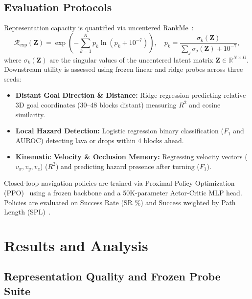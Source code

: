 \documentclass{svproc}
\begin{document}
\subsection{Evaluation Protocols}
Representation capacity is quantified via uncentered RankMe~\cite{garrido2023rankme}:
\begin{equation}
\mathcal{R}_{\text{exp}}(\mathbf{Z}) = \exp\left(-\sum_{k=1}^K p_k \ln(p_k + 10^{-7})\right), \quad p_k = \frac{\sigma_k(\mathbf{Z})}{\sum_j \sigma_j(\mathbf{Z}) + 10^{-7}},
\end{equation}
where $\sigma_k(\mathbf{Z})$ are the singular values of the uncentered latent matrix $\mathbf{Z} \in \mathbb{R}^{N \times D}$. Downstream utility is assessed using frozen linear and ridge probes across three seeds:
\begin{itemize}
    \item \textbf{Distant Goal Direction \& Distance:} Ridge regression predicting relative 3D goal coordinates ($30\text{--}48$ blocks distant) measuring $R^2$ and cosine similarity.
    \item \textbf{Local Hazard Detection:} Logistic regression binary classification ($F_1$ and AUROC) detecting lava or drops within 4 blocks ahead.
    \item \textbf{Kinematic Velocity \& Occlusion Memory:} Regressing velocity vectors ($v_x, v_y, v_z$) ($R^2$) and predicting hazard presence after turning ($F_1$).
\end{itemize}
Closed-loop navigation policies are trained via Proximal Policy Optimization (PPO)~\cite{schulman2017ppo} using a frozen backbone and a 50K-parameter Actor-Critic MLP head. Policies are evaluated on Success Rate (SR \%) and Success weighted by Path Length (SPL)~\cite{anderson2018spl}.

\section{Results and Analysis}

\subsection{Representation Quality and Frozen Probe Suite}
\end{document}
